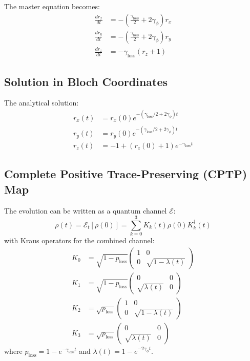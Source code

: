 \documentclass[12pt]{article}
\begin{document}
The master equation becomes:
\begin{align}
\frac{dr_x}{dt} &= -\left( \frac{\gamma_{\text{loss}}}{2} + 2\gamma_{\phi} \right) r_x \\
\frac{dr_y}{dt} &= -\left( \frac{\gamma_{\text{loss}}}{2} + 2\gamma_{\phi} \right) r_y \\
\frac{dr_z}{dt} &= -\gamma_{\text{loss}} (r_z + 1)
\end{align}

\subsection{Solution in Bloch Coordinates}
The analytical solution:
\begin{align}
r_x(t) &= r_x(0) e^{-(\gamma_{\text{loss}}/2 + 2\gamma_{\phi})t} \\
r_y(t) &= r_y(0) e^{-(\gamma_{\text{loss}}/2 + 2\gamma_{\phi})t} \\
r_z(t) &= -1 + (r_z(0) + 1) e^{-\gamma_{\text{loss}}t}
\end{align}

\subsection{Complete Positive Trace-Preserving (CPTP) Map}
The evolution can be written as a quantum channel $\mathcal{E}$:
\[
\rho(t) = \mathcal{E}_t[\rho(0)] = \sum_{k=0}^3 K_k(t) \rho(0) K_k^\dagger(t)
\]
with Kraus operators for the combined channel:
\begin{align}
K_0 &= \sqrt{1-p_{\text{loss}}} \begin{pmatrix} 1 & 0 \\ 0 & \sqrt{1-\lambda(t)} \end{pmatrix} \\
K_1 &= \sqrt{1-p_{\text{loss}}} \begin{pmatrix} 0 & 0 \\ \sqrt{\lambda(t)} & 0 \end{pmatrix} \\
K_2 &= \sqrt{p_{\text{loss}}} \begin{pmatrix} 1 & 0 \\ 0 & \sqrt{1-\lambda(t)} \end{pmatrix} \\
K_3 &= \sqrt{p_{\text{loss}}} \begin{pmatrix} 0 & 0 \\ \sqrt{\lambda(t)} & 0 \end{pmatrix}
\end{align}
where $p_{\text{loss}} = 1 - e^{-\gamma_{\text{loss}} t}$ and $\lambda(t) = 1 - e^{-2\gamma_{\phi} t}$.
\end{document}
